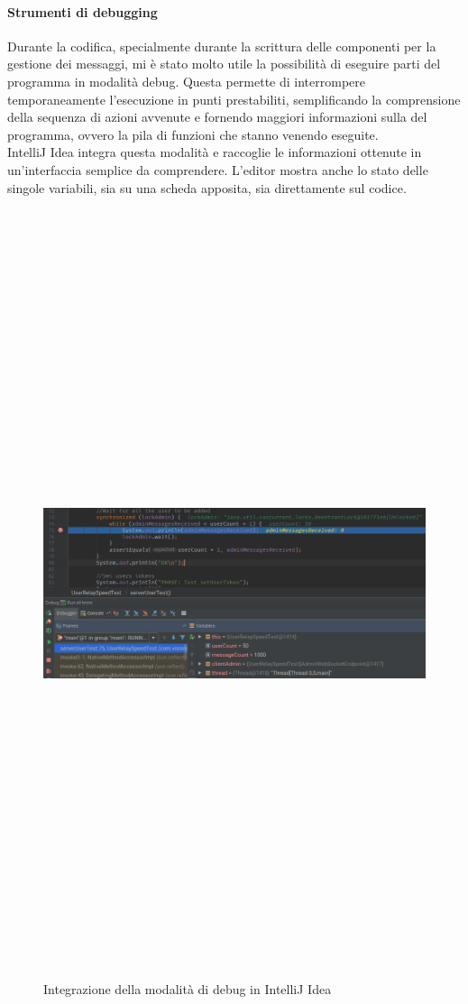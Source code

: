 		\paragraph{Strumenti di debugging}
		Durante la codifica, specialmente durante la scrittura delle componenti per la gestione dei messaggi, mi è stato molto utile la possibilità di eseguire parti del programma in modalità debug. Questa permette di interrompere temporaneamente l'esecuzione in punti prestabiliti, semplificando la comprensione della sequenza di azioni avvenute e fornendo maggiori informazioni sulla  del programma, ovvero la pila di funzioni che stanno venendo eseguite.
		\\
		IntelliJ Idea integra questa modalità e raccoglie le informazioni ottenute in un'interfaccia semplice da comprendere. L'editor mostra anche lo stato delle singole variabili, sia su una scheda apposita, sia direttamente sul codice. 
		\begin{figure}[H]
			\begin{center}
				\includegraphics[width=16.5cm,height=22.5cm,keepaspectratio]{immagini/intellij-debugger}
				\caption{Integrazione della modalità di debug in IntelliJ Idea}
			\end{center}
		\end{figure}

